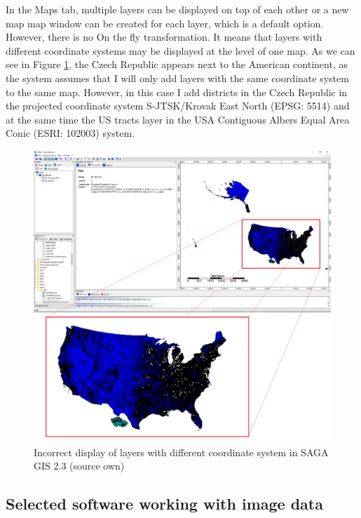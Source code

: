 \documentclass[a4paper,10pt,twoside]{article}
\begin{document}
In the Maps tab, multiple layers can be displayed on top of each other or a new map map window can be created for each layer, which is a default option. However, there is no On the fly transformation. It means that layers with different coordinate systems may be displayed at the level of one map. As we can see in Figure \ref{fig:saga_gis_cele}, the Czech Republic appears next to the American continent, as the system assumes that I will only add layers with the same coordinate system to the same map. However, in this case I add districts in the Czech Republic in the projected coordinate system S-JTSK/Krovak East North (EPSG: 5514) and at the same time the US tracts layer in the USA Contiguous Albers Equal Area Conic (ESRI: 102003) system.

\vspace{0.3cm}
\begin{figure}[hbt!] 
\begin{center}
\includegraphics[width=15cm]{../pictures/saga_gis_cele.png} 
\caption[Incorrect display of layers with different coordinate system in SAGA GIS 2.3 (source own)]{Incorrect display of layers with different coordinate system in SAGA GIS 2.3 (source own)}
\label{fig:saga_gis_cele}
\end{center}
\end{figure}


\subsection{Selected software working with image data}
\end{document}
